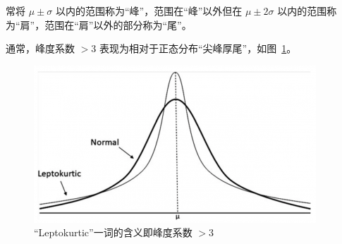 \documentclass[../main.tex]{subfiles}
\begin{document}
常将 $\mu\pm\sigma$ 以内的范围称为“峰”，范围在“峰”以外但在 $\mu\pm2\sigma$ 以内的范围称为“肩”，范围在“肩”以外的部分称为“尾”。

通常，峰度系数 $>3$ 表现为相对于正态分布“尖峰厚尾”，如图~\ref{fig:4.5.2}。

\begin{figure}[!ht]
    \centering
    \includegraphics[scale=0.6]{figures/Leptokurtic-vs-Normal.png}
    \caption{“Leptokurtic”一词的含义即峰度系数 $>3$}
    \label{fig:4.5.2}
\end{figure}
\end{document}
